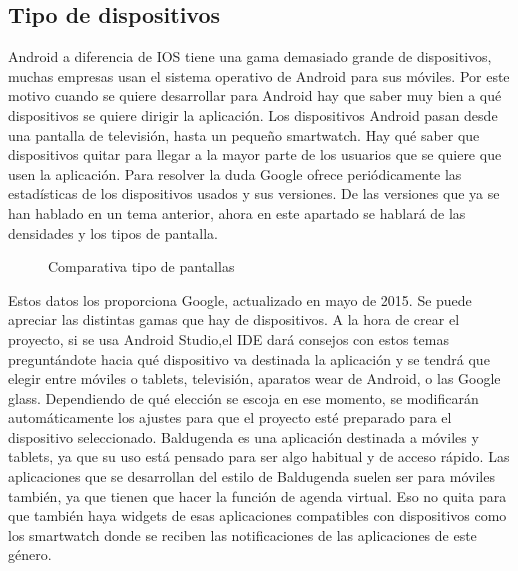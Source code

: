 \subsection{Tipo de dispositivos}
\label{subsecc:Tipo de dispositivos}

Android a diferencia de IOS tiene una gama demasiado grande de dispositivos, muchas empresas usan el sistema operativo de Android para sus móviles.
Por este motivo cuando se quiere desarrollar para Android hay que saber muy bien a qué dispositivos se quiere dirigir la aplicación.
Los dispositivos Android pasan desde una pantalla de televisión, hasta un pequeño smartwatch.
Hay qué saber que dispositivos quitar para llegar a la mayor parte de los usuarios que se quiere que usen la aplicación.
Para resolver la duda Google ofrece periódicamente las estadísticas de los dispositivos usados y sus versiones.
De las versiones que ya se han hablado en un tema anterior, ahora en este apartado se hablará de las densidades y los tipos de pantalla.

\begin{figure}[H] 
  \begin{center} 
    \caption{Comparativa tipo de pantallas} 
    \label{fig:ComparativaPantallas} 
  \end{center} 
\end{figure}

Estos datos los proporciona Google, actualizado en mayo de 2015.
Se puede apreciar las distintas gamas que hay de dispositivos. A la hora de crear el proyecto, si se usa Android Studio,el IDE dará consejos con estos temas preguntándote hacia qué dispositivo va destinada la aplicación y se tendrá  que elegir entre móviles o tablets, televisión, aparatos wear de Android, o las Google glass.
Dependiendo de qué elección se escoja en ese momento, se modificarán automáticamente los ajustes para que el proyecto esté preparado para el dispositivo seleccionado.
Baldugenda es una aplicación destinada a móviles y tablets, ya que su uso está pensado para ser algo habitual y de acceso rápido.
Las aplicaciones que se desarrollan del estilo de Baldugenda suelen ser para móviles también, ya que tienen que hacer la función de agenda virtual. Eso no quita para que también haya widgets de esas aplicaciones compatibles con dispositivos como los smartwatch donde se reciben las notificaciones de las aplicaciones de este género.

